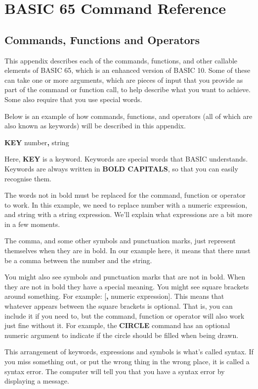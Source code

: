 \hypersetup{bookmarksdepth=2}
\chapter{BASIC 65 Command Reference}

\section{Commands, Functions and Operators}

This appendix describes each of the commands, functions, and other callable
elements of BASIC 65, which is an enhanced version of BASIC 10. Some of these
can take one or more arguments, which are pieces of input that you provide as
part of the command or function call, to help describe what you want to achieve.
Some also require that you use special words.

Below is an example of how commands, functions, and operators
(all of which are also known as keywords) will be described in this appendix.

{\bf KEY} number{\bf,} string

Here, {\bf KEY} is a keyword. Keywords are special words that
BASIC understands. Keywords are always written in {\bf BOLD CAPITALS}, so that
you can easily recognise them.

The words not in bold must be replaced for the command, function or operator to
work. In this example, we need to replace number with a numeric expression, and
string with a string expression. We'll explain what expressions are a bit more
in a few moments.

The comma, and some other symbols and punctuation marks, just represent
themselves when they are in bold. In our example here, it means that there must
be a comma between the number and the string.

You might also see symbols and punctuation marks that are not in bold. When
they are not in bold they have a special meaning. You might see square
brackets around something. For example: [{\bf,} numeric expression]. This means
that whatever appears between the square brackets is optional. That is, you can
include it if you need to, but the command, function or operator will also work
just fine without it. For example, the {\bf CIRCLE} command has an optional
numeric argument to indicate if the circle should be filled when being drawn.

This arrangement of keywords, expressions and symbols is what's called syntax. If
you miss something out, or put the wrong thing in the wrong place, it is called
a syntax error. The computer will tell you that you have a syntax error by displaying
a  message.

